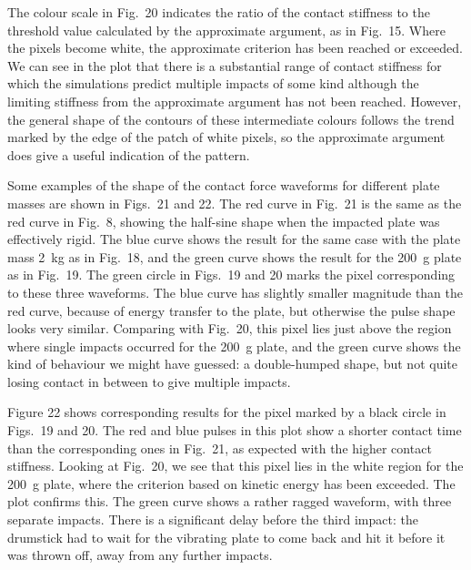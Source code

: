   The colour scale in Fig.\ 20 indicates the ratio of the contact stiffness to 
  the threshold value calculated by the approximate argument, as in Fig.\ 15. 
  Where the pixels become white, the approximate criterion has been reached or 
  exceeded. We can see in the plot that there is a substantial range of contact 
  stiffness for which the simulations predict multiple impacts of some kind 
  although the limiting stiffness from the approximate argument has not been 
  reached. However, the general shape of the contours of these intermediate 
  colours follows the trend marked by the edge of the patch of white pixels, so 
  the approximate argument does give a useful indication of the pattern. 

  Some examples of the shape of the contact force waveforms for different plate 
  masses are shown in Figs.\ 21 and 22. The red curve in Fig.\ 21 is the same 
  as the red curve in Fig.\ 8, showing the half-sine shape when the impacted 
  plate was effectively rigid. The blue curve shows the result for the same 
  case with the plate mass 2~kg as in Fig.\ 18, and the green curve shows the 
  result for the 200~g plate as in Fig.\ 19. The green circle in Figs.\ 19 and 
  20 marks the pixel corresponding to these three waveforms. The blue curve has 
  slightly smaller magnitude than the red curve, because of energy transfer to 
  the plate, but otherwise the pulse shape looks very similar. Comparing with 
  Fig.\ 20, this pixel lies just above the region where single impacts occurred 
  for the 200~g plate, and the green curve shows the kind of behaviour we might 
  have guessed: a double-humped shape, but not quite losing contact in between 
  to give multiple impacts. 


  Figure 22 shows corresponding results for the pixel marked by a black circle 
  in Figs.\ 19 and 20. The red and blue pulses in this plot show a shorter 
  contact time than the corresponding ones in Fig.\ 21, as expected with the 
  higher contact stiffness. Looking at Fig.\ 20, we see that this pixel lies in 
  the white region for the 200~g plate, where the criterion based on kinetic 
  energy has been exceeded. The plot confirms this. The green curve shows a 
  rather ragged waveform, with three separate impacts. There is a significant 
  delay before the third impact: the drumstick had to wait for the vibrating 
  plate to come back and hit it before it was thrown off, away from any further 
  impacts. 

